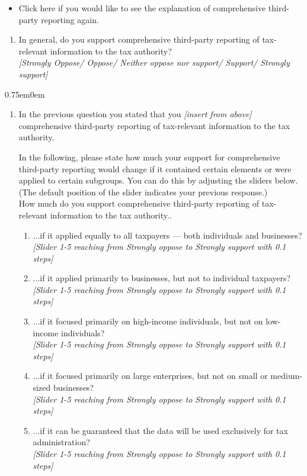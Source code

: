 \documentclass[11pt]{article}
\begin{document}
\vspace{0.5em}
\begin{itemize}
    \item[$\rightarrow$] Click here if you would like to see the explanation of comprehensive third-party reporting again.
\end{itemize}
\begin{enumerate}[resume]
    \item \label{question:tprsupport} In general, do you support comprehensive third-party reporting of tax-relevant information to the tax authority? \\ \textit{[Strongly Oppose/ Oppose/ Neither oppose nor support/ Support/  Strongly support]}
\end{enumerate}

\begin{adjustwidth}{0.75em}{0em} \end{adjustwidth}  
\begin{enumerate}[resume]
    \item \label{question:tprsupportcondition} 
    In the previous question you stated that you \textit{[insert from above]} comprehensive third-party reporting of tax-relevant information to the tax authority.
    
    In the following, please state how much your support for comprehensive third-party reporting would change if it contained certain elements or were applied to certain subgroups. You can do this by adjusting the sliders below. (The default position of the slider indicates your previous response.) \\

    How much do you support comprehensive third-party reporting of tax-relevant information to the tax authority..

\begin{enumerate}[label=\alph*)]
    \item ...if it applied equally to all taxpayers — both individuals and businesses?\\
    \textit{[Slider 1-5 reaching from Strongly oppose to Strongly support with 0.1 steps]}
    \item ...if it applied primarily to businesses, but not to individual taxpayers?\\
    \textit{[Slider 1-5 reaching from Strongly oppose to Strongly support with 0.1 steps]}
    \item ...if it focused primarily on high-income individuals, but not on low-income individuals?\\
    \textit{[Slider 1-5 reaching from Strongly oppose to Strongly support with 0.1 steps]}
    \item ...if it focused primarily on large enterprises, but not on small or medium-sized businesses?\\
    \textit{[Slider 1-5 reaching from Strongly oppose to Strongly support with 0.1 steps]}
    \item ...if it can be guaranteed that the data will be used exclusively for tax administration?\\
    \textit{[Slider 1-5 reaching from Strongly oppose to Strongly support with 0.1 steps]}
    \end{enumerate}
\end{enumerate}    
\end{document}
